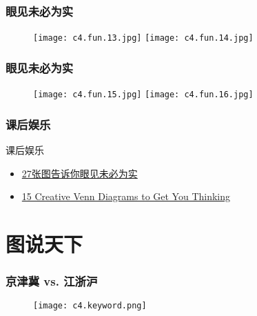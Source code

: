 \begin{frame}
  \frametitle{眼见未必为实}
  \begin{figure}
    \centering
    \texttt{[image: c4.fun.13.jpg]}\quad
    \texttt{[image: c4.fun.14.jpg]}
  \end{figure}
\end{frame}

\begin{frame}
  \frametitle{眼见未必为实}
  \begin{figure}
    \centering
    \texttt{[image: c4.fun.15.jpg]}\quad
    \texttt{[image: c4.fun.16.jpg]}
  \end{figure}
\end{frame}

\begin{frame}
  \frametitle{课后娱乐}
  \begin{block}{课后娱乐}
    \begin{itemize}
      \item \href{http://www.guancha.cn/Celebrity/2014_11_04_282826.shtml}{27张图告诉你眼见未必为实}
      \item \href{http://creately.com/blog/diagrams/creative-venn-diagrams/}{15 Creative Venn Diagrams to Get You Thinking}
    \end{itemize}
  \end{block}
\end{frame}

\section{图说天下}
\begin{frame}
  \frametitle{京津冀 vs. 江浙沪}
  \begin{figure}
    \centering
    \texttt{[image: c4.keyword.png]}
  \end{figure}
\end{frame}



